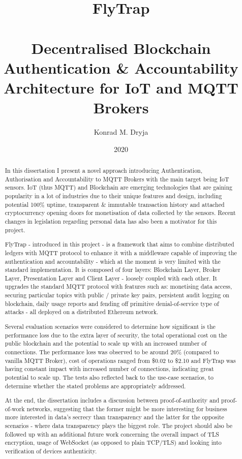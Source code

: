 \documentclass[msci]{abdnthesis}
\title{%
FlyTrap \\
\large\ \\
\huge Decentralised Blockchain Authentication \& Accountability Architecture for IoT and MQTT Brokers}
\author{Konrad M. Dryja}
\date{2020}
\begin{document}

\maketitle
\makedeclaration


\begin{abstract}
  In this dissertation I present a novel approach introducing Authentication, Authorisation and Accountability to MQTT Brokers with the main target being IoT sensors. IoT (thus MQTT) and Blockchain are emerging technologies that are gaining popularity in a lot of industries due to their unique features and design, including potential 100\% uptime, transparent \& immutable transaction history and attached cryptocurrency opening doors for monetisation of data collected by the sensors. Recent changes in legislation regarding personal data has also been a motivator for this project.
  
  FlyTrap - introduced in this project - is a framework that aims to combine distributed ledgers with MQTT protocol to enhance it with a middleware capable of improving the authentication and accountability - which at the moment is very limited with the standard implementation. It is composed of four layers: Blockchain Layer, Broker Layer, Presentation Layer and Client Layer - loosely coupled with each other. It upgrades the standard MQTT protocol with features such as: monetising data access, securing particular topics with public / private key pairs, persistent audit logging on blockchain, daily usage reports and fending off primitive denial-of-service type of attacks - all deployed on a distributed Ethereum network.
  
  Several evaluation scenarios were considered to determine how significant is the performance loss due to the extra layer of security, the total operational cost on the public blockchain and the potential to scale up with an increased number of connections. The performance loss was observed to be around 20\% (compared to vanilla MQTT Broker), cost of operations ranged from \$0.02 to \$2.10 and FlyTrap was having constant impact with increased number of connections, indicating great potential to scale up. The tests also reflected back to the use-case scenarios, to determine whether the stated problems are appropriately addressed.
  
  At the end, the dissertation includes a discussion between proof-of-authority and proof-of-work networks, suggesting that the former might be more interesting for business more interested in data's secrecy than transparency and the latter for the opposite scenarios - where data transparency plays the biggest role. The project should also be followed up with an additional future work concerning the overall impact of TLS encryption, usage of WebSocket (as opposed to plain TCP/TLS) and looking into verification of devices authenticity.
  

\end{abstract}
\end{document}
